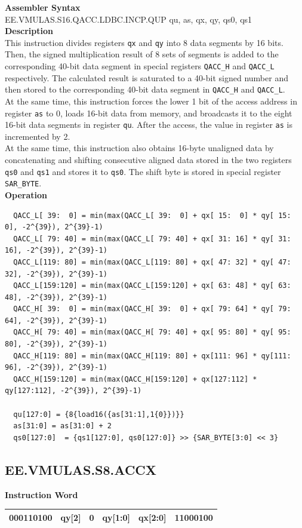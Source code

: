 \textbf{Assembler Syntax} \\
EE.VMULAS.S16.QACC.LDBC.INCP.QUP qu, as, qx, qy, qs0, qs1 \\
\textbf{Description} \\
This instruction divides registers \lstinline{qx} and \lstinline{qy} into 8 data segments by 16 bits. Then, the signed multiplication result of 8 sets of segments is added to the corresponding 40-bit data segment in special registers \lstinline{QACC_H} and \lstinline{QACC_L} respectively. The calculated result is saturated to a 40-bit signed number and then stored to the corresponding 40-bit data segment in \lstinline{QACC_H} and \lstinline{QACC_L}.\\
At the same time, this instruction forces the lower 1 bit of the access address in register \lstinline{as} to 0, loads 16-bit data from memory, and broadcasts it to the eight 16-bit data segments in register \lstinline{qu}. After the access, the value in register \lstinline{as} is incremented by 2.\\
At the same time, this instruction also obtains 16-byte unaligned data by concatenating and shifting consecutive aligned data stored in the two registers \lstinline{qs0} and \lstinline{qs1} and stores it to \lstinline{qs0}. The shift byte is stored in special register \lstinline{SAR_BYTE}.\\
\textbf{Operation}
\begin{lstlisting}
  QACC_L[ 39:  0] = min(max(QACC_L[ 39:  0] + qx[ 15:  0] * qy[ 15:  0], -2^{39}), 2^{39}-1)
  QACC_L[ 79: 40] = min(max(QACC_L[ 79: 40] + qx[ 31: 16] * qy[ 31: 16], -2^{39}), 2^{39}-1)
  QACC_L[119: 80] = min(max(QACC_L[119: 80] + qx[ 47: 32] * qy[ 47: 32], -2^{39}), 2^{39}-1)
  QACC_L[159:120] = min(max(QACC_L[159:120] + qx[ 63: 48] * qy[ 63: 48], -2^{39}), 2^{39}-1)
  QACC_H[ 39:  0] = min(max(QACC_H[ 39:  0] + qx[ 79: 64] * qy[ 79: 64], -2^{39}), 2^{39}-1)
  QACC_H[ 79: 40] = min(max(QACC_H[ 79: 40] + qx[ 95: 80] * qy[ 95: 80], -2^{39}), 2^{39}-1)
  QACC_H[119: 80] = min(max(QACC_H[119: 80] + qx[111: 96] * qy[111: 96], -2^{39}), 2^{39}-1)
  QACC_H[159:120] = min(max(QACC_H[159:120] + qx[127:112] * qy[127:112], -2^{39}), 2^{39}-1)

  qu[127:0] = {8{load16({as[31:1],1{0}})}}
  as[31:0] = as[31:0] + 2
  qs0[127:0]  = {qs1[127:0], qs0[127:0]} >> {SAR_BYTE[3:0] << 3}
\end{lstlisting}

\clearpage
\subsection{EE.VMULAS.S8.ACCX}\label{instruction:EEVMULASS8ACCX}
\setlength\tabcolsep{6pt}
\textbf{Instruction Word} \\
\begin{tabular}{|c|c|c|c|c|c|}
	\hline
	000110100 & qy[2] & 0 & qy[1:0] & qx[2:0] & 11000100 \\
	\hline
\end{tabular}


